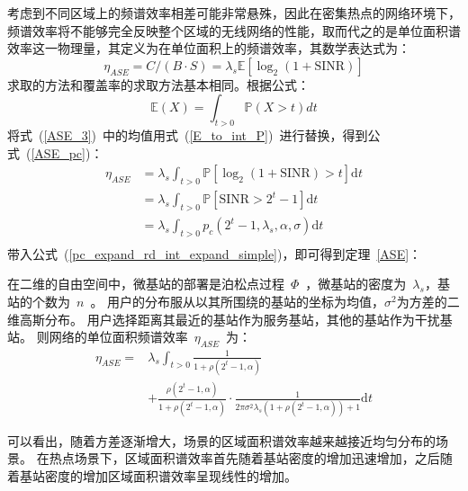 考虑到不同区域上的频谱效率相差可能非常悬殊，因此在密集热点的网络环境下，
频谱效率将不能够完全反映整个区域的无线网络的性能，取而代之的是单位面积谱效率这一物理量，其定义为在单位面积上的频谱效率，其数学表达式为：
\begin{equation}\label{ASE_3}
  \eta_{ASE}=C/(B\cdot S) = \lambda_s\mathbb{E}[\log_2(1+\mathrm{SINR})]
\end{equation}
求取的方法和覆盖率的求取方法基本相同。根据公式：
\begin{equation}\label{E_to_int_P}
\mathbb{E}(X)=\int_{t>0}\mathbb{P}(X>t)dt
\end{equation}
将式~(\ref{ASE_3})~中的均值用式~(\ref{E_to_int_P})~进行替换，得到公式~(\ref{ASE_pc})：
\begin{equation}\label{ASE_pc}
  \begin{aligned}
  \eta_{ASE} &= \lambda_s\int_{t>0} \mathbb{P}[\log_2(1 + \mathrm{SINR}) > t] \mathrm{d} t \\
             &= \lambda_s\int_{t>0} \mathbb{P}[\mathrm{SINR} > 2 ^ {t}-1] \mathrm{d} t \\
             &= \lambda_s\int_{t>0} p_c(2^{t}-1,\lambda_s,\alpha,\sigma) \mathrm{d} t \\
  \end{aligned}
\end{equation}
带入公式~(\ref{pc_expand_rd_int_expand_simple})，即可得到定理~\ref{ASE}：
\begin{theorem}\label{ASE}
  在二维的自由空间中，微基站的部署是泊松点过程~$\Phi$~，微基站的密度为~$\lambda_s$，基站的个数为~$n$~。
  用户的分布服从以其所围绕的基站的坐标为均值，$\sigma^2$为方差的二维高斯分布。
  用户选择距离其最近的基站作为服务基站，其他的基站作为干扰基站。
  则网络的单位面积频谱效率~$\eta_{ASE}$~为：
  \begin{equation}\label{ASE_pc_expand}
    \begin{aligned}
    \eta_{ASE} =& \lambda_s\int_{t>0} \frac{1}{1+\rho(2 ^ {t}-1,\alpha)} \\
                &+ \frac{\rho(2 ^ {t}-1,\alpha)}{1+\rho(2 ^ {t}-1,\alpha)}\cdot\frac{1}{2\pi\sigma^2\lambda_s(1+\rho(2 ^ {t}-1,\alpha))+1}  \mathrm{d} t
    \end{aligned}
  \end{equation}
\end{theorem}

可以看出，随着方差逐渐增大，场景的区域面积谱效率越来越接近均匀分布的场景。
在热点场景下，区域面积谱效率首先随着基站密度的增加迅速增加，之后随着基站密度的增加区域面积谱效率呈现线性的增加。

